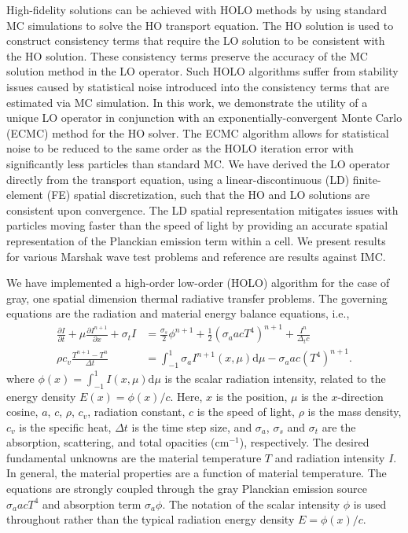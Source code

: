 \documentclass{mc2013}
\newcommand{\pderiv}[2]{\frac{\partial #1}{\partial #2}}
\renewcommand{\d}{\mathrm{d}}
\begin{document}
High-fidelity solutions can be achieved with HOLO methods by using standard
MC simulations to solve the HO transport
equation. The HO solution is used to construct consistency
terms that require the LO solution to be consistent with the HO solution.  These
consistency terms preserve
the accuracy of the MC solution method in the LO operator. Such HOLO algorithms suffer from stability issues caused by statistical noise introduced into the
consistency terms that are estimated via MC simulation.  
In this work, we demonstrate the utility of a unique LO operator in conjunction with
an exponentially-convergent Monte
Carlo (ECMC) method\cite{jake} for the HO solver.  The ECMC algorithm
allows for statistical noise to be reduced to the same order as the HOLO iteration
error with significantly less particles than standard MC. We have derived the LO operator
directly from the transport equation, using a linear-discontinuous (LD)
finite-element (FE) spatial
discretization, such that the
HO and LO solutions are consistent upon convergence. The LD spatial representation
mitigates issues with particles moving faster than the speed of light by providing an
accurate spatial representation of the Planckian emission term within a cell.  We
present results for various Marshak wave test problems and reference are results
against IMC.



We have implemented a high-order low-order (HOLO) algorithm for the case of gray, one spatial dimension
thermal radiative transfer problems. The governing equations are the radiation and
material energy balance equations, i.e.,
\begin{align}
\pderiv{I}{t} + \mu \pderiv{I^{n+1}}{x} + \sigma_t I
&= \frac{\sigma_s}{2} \phi^{n+1} +\frac{1}{2} \left(\sigma_a a c T^4
\right)^{n+1} + \frac{I^n}{\Delta_t c}  \\
\rho c_v \frac{T^{n+1} - T^n}{\Delta t} &= \int_{-1}^{1} \sigma_a I^{n+1}(x,\mu)
\d\mu - \sigma_a a c (T^4)^{n+1} .
\end{align}
where $\phi(x) = \int_{-1}^1 I(x,\mu) \d \mu$ is the scalar radiation intensity,
related to the energy density $E(x)=\phi(x)/c$. Here, $x$ is the position,  $\mu$ is
the $x$-direction cosine, $a$, $c$, $\rho$, $c_v$,  radiation
constant, $c$ is the speed of light, $\rho$ is the mass density, $c_v$ is the specific heat, $\Delta t$ is the time step size, and $\sigma_a$, $\sigma_s$ and $\sigma_t$ are the absorption, scattering, and total
opacities (cm$^{-1}$), respectively.  The desired fundamental unknowns are the material
temperature $T$ and radiation intensity $I$.  In general, the material properties are a function of material temperature.
The equations are strongly coupled through the gray Planckian emission source
$\sigma_a a c T^4$ and absorption term $\sigma_a \phi$.  
The notation of the scalar intensity $\phi$ is used throughout rather than the
typical radiation energy density $E=\phi(x)/c$.
\end{document}
